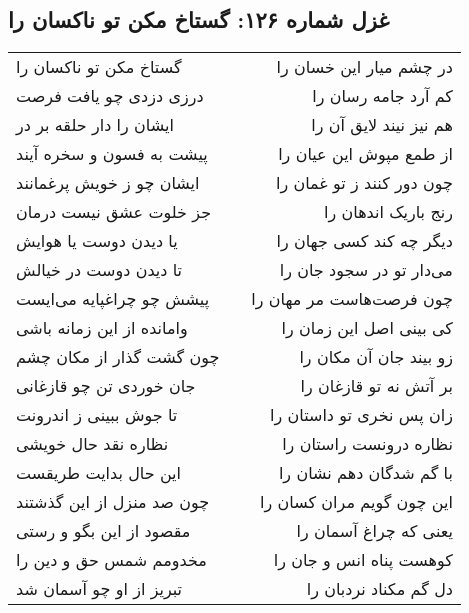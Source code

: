 \begin{center}
\section*{غزل شماره ۱۲۶: گستاخ مکن تو ناکسان را}
\label{sec:0126}
\begin{longtable}{l p{0.5cm} r}
گستاخ مکن تو ناکسان را
&&
در چشم میار این خسان را
\\
درزی دزدی چو یافت فرصت
&&
کم آرد جامه رسان را
\\
ایشان را دار حلقه بر در
&&
هم نیز نیند لایق آن را
\\
پیشت به فسون و سخره آیند
&&
از طمع مپوش این عیان را
\\
ایشان چو ز خویش پرغمانند
&&
چون دور کنند ز تو غمان را
\\
جز خلوت عشق نیست درمان
&&
رنج باریک اندهان را
\\
یا دیدن دوست یا هوایش
&&
دیگر چه کند کسی جهان را
\\
تا دیدن دوست در خیالش
&&
می‌دار تو در سجود جان را
\\
پیشش چو چراغپایه می‌ایست
&&
چون فرصت‌هاست مر مهان را
\\
وامانده از این زمانه باشی
&&
کی بینی اصل این زمان را
\\
چون گشت گذار از مکان چشم
&&
زو بیند جان آن مکان را
\\
جان خوردی تن چو قازغانی
&&
بر آتش نه تو قازغان را
\\
تا جوش ببینی ز اندرونت
&&
زان پس نخری تو داستان را
\\
نظاره نقد حال خویشی
&&
نظاره درونست راستان را
\\
این حال بدایت طریقست
&&
با گم شدگان دهم نشان را
\\
چون صد منزل از این گذشتند
&&
این چون گویم مران کسان را
\\
مقصود از این بگو و رستی
&&
یعنی که چراغ آسمان را
\\
مخدومم شمس حق و دین را
&&
کوهست پناه انس و جان را
\\
تبریز از او چو آسمان شد
&&
دل گم مکناد نردبان را
\\
\end{longtable}
\end{center}
